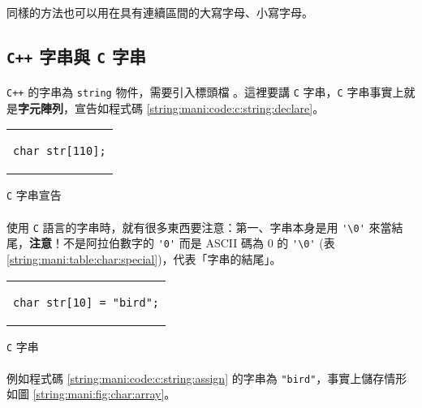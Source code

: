 \documentclass[12pt,a4paper,oneside]{report}
\begin{document}
\begin{CJK}{UTF8}{bkai}
\paragraph{}同樣的方法也可以用在具有連續區間的大寫字母、小寫字母。

\subsection{\texttt{C++} 字串與 \texttt{C} 字串}

\paragraph{}\texttt{C++} 的字串為 \lstinline!string! 物件，需要引入標頭檔 。這裡要講 \texttt{C} 字串，\texttt{C} 字串事實上就是{\color{red}\textbf{字元陣列}}，宣告如程式碼 \ref{string:mani:code:c:string:declare}。

\begin{code}[h!]
  \centering
  \begin{tabular}{c}
  \begin{lstlisting}
char str[110];
  \end{lstlisting}
  \end{tabular}
  \caption{\texttt{C} 字串宣告}
  \label{string:mani:code:c:string:declare}
\end{code}

\paragraph{}使用 \texttt{C} 語言的字串時，就有很多東西要注意：第一、字串本身是用 \lstinline!'\0'! 來當結尾，{\color{red}\textbf{注意}}！不是阿拉伯數字的 \lstinline!'0'! 而是 ASCII 碼為 0 的 \lstinline!'\0'! (表 \ref{string:mani:table:char:special})，代表「字串的結尾」。

\begin{code}[h!]
  \centering
  \begin{tabular}{c}
  \begin{lstlisting}
char str[10] = "bird";
  \end{lstlisting}
  \end{tabular}
  \caption{\texttt{C} 字串}
  \label{string:mani:code:c:string:assign}
\end{code}

\paragraph{}例如程式碼 \ref{string:mani:code:c:string:assign} 的字串為 \lstinline!"bird"!，事實上儲存情形如圖 \ref{string:mani:fig:char:array}。


\end{CJK}
\end{document}
